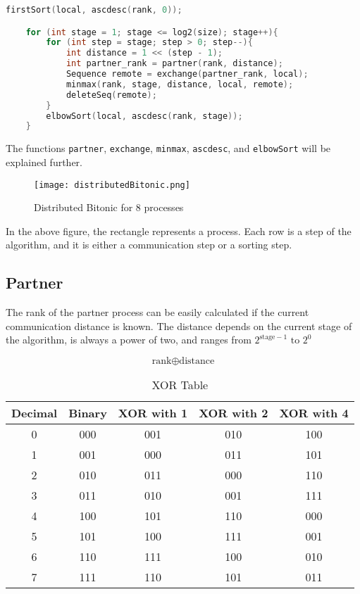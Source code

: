 \documentclass[12pt]{article}
\begin{document}
\begin{lstlisting}[language=C]
    firstSort(local, ascdesc(rank, 0));

    for (int stage = 1; stage <= log2(size); stage++){
        for (int step = stage; step > 0; step--){
            int distance = 1 << (step - 1);
            int partner_rank = partner(rank, distance);
            Sequence remote = exchange(partner_rank, local);
            minmax(rank, stage, distance, local, remote);
            deleteSeq(remote);
        }
        elbowSort(local, ascdesc(rank, stage));
    }
\end{lstlisting}

The functions \texttt{partner}, \texttt{exchange}, \texttt{minmax}, \texttt{ascdesc}, and \texttt{elbowSort} will be explained further.

\begin{figure}[H]
    \centering
    \texttt{[image: distributedBitonic.png]}
    \caption{Distributed Bitonic for 8 processes}
    \label{fig:enter-label}
\end{figure}

In the above figure, the rectangle represents a process. Each row is a step of the algorithm, and it is either a communication step or a sorting step.
\newpage

\subsection{Partner}
The rank of the partner process can be easily calculated if the current communication distance is known. The distance depends on the current stage of the algorithm, is always a power of two, and ranges from \( 2^{\text{stage}-1} \text{ to } 2^0 \)

\[\text{rank} \oplus \text{distance}\]
\begin{table}[h]
    \centering
    \begin{tabular}{|c|c|c|c|c|}
        \hline
        \textbf{Decimal} & \textbf{Binary} & \textbf{XOR with 1} & \textbf{XOR with 2} & \textbf{XOR with 4} \\ \hline
        0 & 000 & 001 & 010 & 100 \\ \hline
        1 & 001 & 000 & 011 & 101 \\ \hline
        2 & 010 & 011 & 000 & 110 \\ \hline
        3 & 011 & 010 & 001 & 111 \\ \hline
        4 & 100 & 101 & 110 & 000 \\ \hline
        5 & 101 & 100 & 111 & 001 \\ \hline
        6 & 110 & 111 & 100 & 010 \\ \hline
        7 & 111 & 110 & 101 & 011 \\ \hline
    \end{tabular}
    \caption{XOR Table}
    \label{tab:xor}
\end{table}
\end{document}
